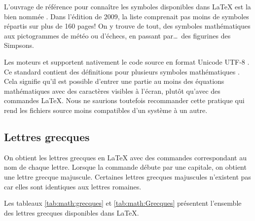 L'ouvrage de référence pour connaître les symboles disponibles dans
{\LaTeX} est la bien nommée %
. %
Dans l'édition de 2009, la liste comprenait pas moins de 
symboles répartis sur plus de 160 pages! On y trouve de tout, des
symboles mathématiques aux pictogrammes de météo ou d'échecs, en
passant par\dots\ des figurines des Simpsons.

\begin{important}
  Les moteurs {\XeTeX} et {\LuaTeX} supportent nativement le code
  source en format Unicode UTF-8 \citep{Unicode:5.0}. Ce standard
  contient des définitions pour plusieurs symboles mathématiques
  \citep{wikipedia:unicode-math}. Cela signifie qu'il est possible
  d'entrer une partie au moins des équations mathématiques avec des
  caractères visibles à l'écran, plutôt qu'avec des commandes {\LaTeX}.
  Nous ne saurions toutefois recommander cette pratique qui rend les
  fichiers source moins compatibles d'un système à un autre.
\end{important}

\subsection{Lettres grecques}
\label{sec:math:symboles:grecques}

On obtient les lettres grecques en {\LaTeX} avec des commandes
correspondant au nom de chaque lettre. Lorsque la commande débute par
une capitale, on obtient une lettre grecque majuscule. Certaines
lettres grecques majuscules n'existent pas car elles sont identiques
aux lettres romaines.

Les tableaux \ref{tab:math:grecques} et \ref{tab:math:Grecques}
présentent l'ensemble des lettres grecques disponibles dans {\LaTeX}.

